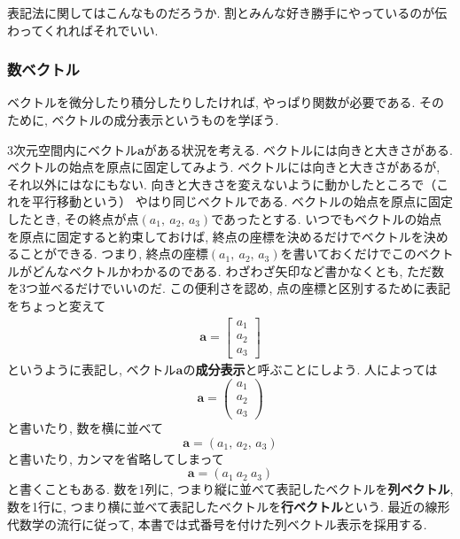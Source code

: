 表記法に関してはこんなものだろうか. 割とみんな好き勝手にやっているのが伝わってくれればそれでいい. 

\subsubsection{数ベクトル}
ベクトルを微分したり積分したりしたければ, やっぱり関数が必要である. そのために, ベクトルの成分表示というものを学ぼう. 

3次元空間内にベクトル$\bm{a}$がある状況を考える. ベクトルには向きと大きさがある. ベクトルの始点を原点に固定してみよう. 
ベクトルには向きと大きさがあるが, それ以外にはなにもない. 向きと大きさを変えないように動かしたところで（これを平行移動という）
やはり同じベクトルである. 
ベクトルの始点を原点に固定したとき, その終点が点$(a_1, \ a_2, \, a_3)$であったとする. 
いつでもベクトルの始点を原点に固定すると約束しておけば, 終点の座標を決めるだけでベクトルを決めることができる. 
つまり, 終点の座標$(a_1, \ a_2, \, a_3)$を書いておくだけでこのベクトルがどんなベクトルかわかるのである. 
わざわざ矢印など書かなくとも, ただ数を3つ並べるだけでいいのだ. 
この便利さを認め, 点の座標と区別するために表記をちょっと変えて
\begin{eqnarray}
\bm{a} = \left[
 \begin{array}{c}
    a_1 \\
    a_2 \\
    a_3
 \end{array}
           \right]
 \label{eq:vec3d}
 \end{eqnarray}
 というように表記し, ベクトル$\bm{a}$の\textbf{成分表示}と呼ぶことにしよう. 人によっては
 $$
 \bm{a} = \left(
 \begin{array}{c}
    a_1 \\
    a_2 \\
    a_3
 \end{array}
           \right)
$$
と書いたり, 数を横に並べて
$$
\bm{a} = (a_1, \, a_2, \, a_3)
$$
と書いたり, カンマを省略してしまって
$$
\bm{a} = (a_1 \ a_2 \ a_3)
$$
と書くこともある. 数を1列に, つまり縦に並べて表記したベクトルを\textbf{列ベクトル}, 
数を1行に, つまり横に並べて表記したベクトルを\textbf{行ベクトル}という. 
最近の線形代数学の流行に従って, 本書では式番号を付けた列ベクトル表示を採用する. 

